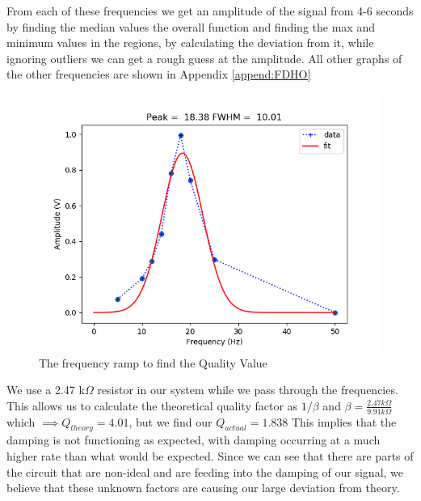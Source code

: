 From each of these frequencies we get an amplitude of the signal from 4-6 seconds by finding the median values the overall function and finding the max and minimum values in the regions, by calculating the deviation from it, while ignoring outliers we can get a rough guess at the amplitude. All other graphs of the other frequencies are shown in Appendix \ref{append:FDHO}

\begin{figure}[ht!]
\centering
\includegraphics[scale=.75]{figures/FDHO/q_value.png}
\caption{The frequency ramp to find the Quality Value}
\label{fig:CD_Diff}
\end{figure}

We use a 2.47 k$\Omega$ resistor in our system while we pass through the frequencies. This allows us to calculate the theoretical quality factor as $1/\beta$ and $\beta = \frac{2.47 k\Omega}{9.91 k\Omega}$ which $\implies Q_{theory} = 4.01$, but we find our $Q_{actual} = 1.838$ This implies that the damping is not functioning as expected, with damping occurring at a much higher rate than what would be expected. Since we can see that there are parts of the circuit that are non-ideal and are feeding into the damping of our signal, we believe that these unknown factors are causing our large deviation from theory.